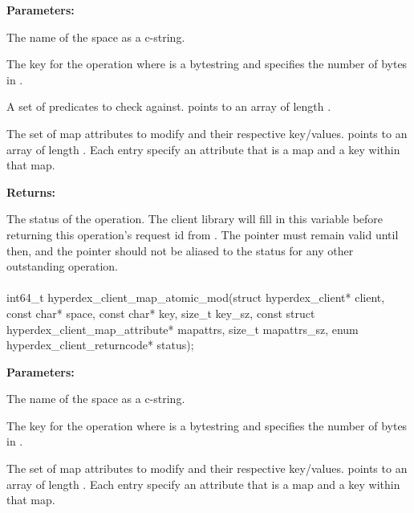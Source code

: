 \noindent\textbf{Parameters:}
\begin{description}[labelindent=\widthof{{\code{mapattrs}, \code{mapattrs\_sz}}},leftmargin=*,noitemsep,nolistsep,align=right]
\item[\code{space}] The name of the space as a c-string.
\item[\code{key}, \code{key\_sz}] The key for the operation where  is a bytestring and  specifies the number of bytes in .
\item[\code{checks}, \code{checks\_sz}] A set of predicates to check against.   points to an array of length .
\item[\code{mapattrs}, \code{mapattrs\_sz}] The set of map attributes to modify and their respective key/values.   points to an array of length .  Each entry specify an attribute that is a map and a key within that map.
\end{description}

\noindent\textbf{Returns:}
\begin{description}[labelindent=\widthof{{\code{status}}},leftmargin=*,noitemsep,nolistsep,align=right]
\item[\code{status}] The status of the operation.  The client library will fill in this variable before returning this operation's request id from .  The pointer must remain valid until then, and the pointer should not be aliased to the status for any other outstanding operation.
\end{description}

\paragraph{}
\label{api:c:map_atomic_mod}
\begin{ccode}
int64_t hyperdex_client_map_atomic_mod(struct hyperdex_client* client,
                const char* space,
                const char* key, size_t key_sz,
                const struct hyperdex_client_map_attribute* mapattrs, size_t mapattrs_sz,
                enum hyperdex_client_returncode* status);
\end{ccode}
\funcdesc 

\noindent\textbf{Parameters:}
\begin{description}[labelindent=\widthof{{\code{mapattrs}, \code{mapattrs\_sz}}},leftmargin=*,noitemsep,nolistsep,align=right]
\item[\code{space}] The name of the space as a c-string.
\item[\code{key}, \code{key\_sz}] The key for the operation where  is a bytestring and  specifies the number of bytes in .
\item[\code{mapattrs}, \code{mapattrs\_sz}] The set of map attributes to modify and their respective key/values.   points to an array of length .  Each entry specify an attribute that is a map and a key within that map.
\end{description}

